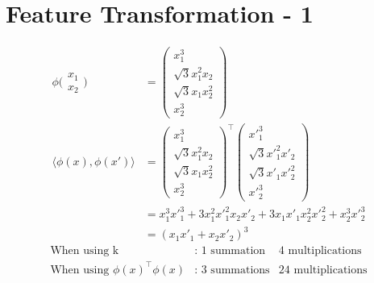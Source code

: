 \section*{Feature Transformation - 1} 

\begin{align}
	\phi \Bigg( \begin{matrix}
		x_1 \\ x_2
	\end{matrix} \Bigg) &= \begin{pmatrix}
		x_1^3 \\ \sqrt{3} x_1^2 x_2 \\ \sqrt{3} x_1 x_2^2 \\ x_2^3
	\end{pmatrix} \\
	\langle \phi(x), \phi(x') \rangle &= \begin{pmatrix}
		x_1^3 \\ \sqrt{3} x_1^2 x_2 \\ \sqrt{3} x_1 x_2^2 \\ x_2^3
	\end{pmatrix}^\top
 	\begin{pmatrix}
			{x'}_{1}^{3} \\ \sqrt{3} {x'}_1^2 x'_2 \\ \sqrt{3} {x'}_1 {x'}_2^2 \\ {x'}_2^3
	\end{pmatrix}\\
		&= x_1^3 {x'}_1^3 + 3x_1^2 {x'}_1^2 x_2 {x'}_2 + 3x_1 {x'}_1 x_2^2 {x'}_2^2 + x_2^3 {x'}_2^3\\
		&= (x_1 {x'}_1 + x_2 {x'}_2)^3
\end{align}
\begin{align}\nonumber
    \text{When using k} &\text{: 1 summation} & \text{4 multiplications} \\ \nonumber
    \text{When using }\phi(x)^\top\phi(x) &\text{: 3 summations} & \text{24 multiplications}
\end{align}


